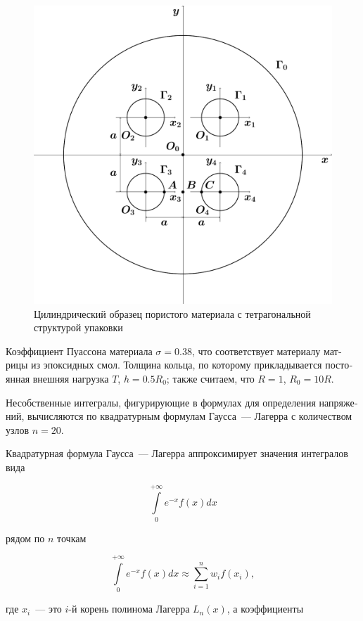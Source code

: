\begin{russian}
\begin{figure}[h!]
\centering
\includegraphics[width=12.2cm]{fig_7-6.pdf}
\caption{\centering Цилиндрический образец пористого материала с тетрагональной структурой упаковки}
\label{f:7:6}
\end{figure}

Коэффициент Пуассона материала $\sigma=0.38$, что соответствует материалу матрицы из эпоксидных смол. Толщина кольца, по которому прикладывается постоянная внешняя нагрузка $T$, $h=0.5R_0$; также считаем, что $R=1$, $R_0=10R$.

Несобственные интегралы, фигурирующие в формулах для определения напряжений, вычисляются по квадратурным формулам Гаусса~--- Лагерра с количеством узлов $n=20$.

Квадратурная формула Гаусса~--- Лагерра аппроксимирует значения интегралов вида

\begin{equation}
\int\limits_0^{ + \infty } {{e^{ - x}}} f(x)dx
\end{equation}

\noindent рядом по $n$ точкам

\begin{equation}
\int\limits_0^{ + \infty } {{e^{ - x}}} f(x)dx \approx \sum\limits_{i = 1}^n {{w_i}} f({x_i}),
\end{equation}

\noindent где $x_i$~--- это $i$-й корень полинома Лагерра $L_n(x)$, а коэффициенты


\end{russian}
